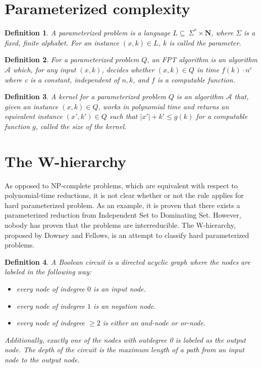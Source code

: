 \documentclass[en]{pracamgr}
\newtheorem{definition}{Definition}
\begin{document}
\section{Parameterized complexity}

\begin{definition}\label{Parameterized problem}
	A {\textup{parameterized problem}} is a language $L \subseteq \ \Sigma^* \times \mathbf{N}$, where $\Sigma$ is a fixed, finite alphabet. For an instance $(x,k) \in L$, $k$ is called the parameter.
\end{definition}

\begin{definition}\label{FPT algorithm}
	For a parameterized problem $Q$, an \textup{FPT algorithm} is an algorithm $\mathcal{A}$ which, for any input $(x,k)$, decides whether $(x,k) \in Q$ in time $f(k)\cdot n^c$ where c is a constant, independent of $n,k$, and $f$ is a computable function.
\end{definition}

\begin{definition}\label{Kernel}
	A \textup{kernel} for a parameterized problem $Q$ is an algorithm $\mathcal{A}$ that, given an instance $(x,k) \in Q$, works in polynomial time and returns an equivalent instance $(x',k') \in Q$
	such that $|x'| + k' \leq g(k)$ for a computable function $g$, called the \textup{size} of the kernel.
\end{definition}

\section{The W-hierarchy}

As opposed to NP-complete problems, which are equivalent with respect to polynomial-time reductions, it is not clear whether or not the rule applies for hard parameterized problem. As an example, it is proven that there exists a parameterized reduction from Independent Set to Dominating Set. However, nobody has proven that the problems are interreducible. The W-hierarchy, proposed by Downey and Fellows, is an attempt to classify hard parameterized problems. 

\begin{definition}
	A {\textup Boolean circuit} is a directed acyclic graph where the nodes are labeled in the following way:
	\begin{itemize}
		\item every node of indegree $0$ is an input node.
		\item every node of indegree $1$ is an negation node.
		\item every node of indegree $\geq 2$ is either an and-node or or-node.
	\end{itemize}
	
	Additionally, exactly one of the nodes with outdegree 0 is labeled as the {\textup output node}. The {\textup depth} of the circuit is the maximum length of a path from an input node to the output node.
\end{definition}
\end{document}
